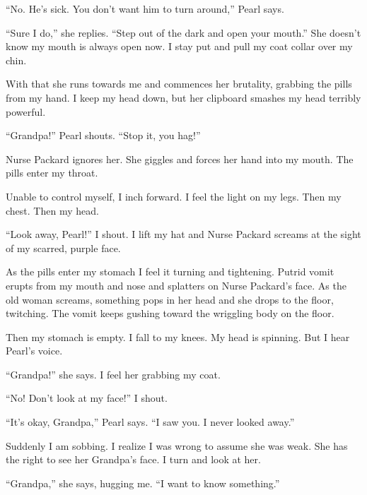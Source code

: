 ``No. He's sick. You don't want him to turn
around,'' Pearl says.



``Sure I do,'' she replies. ``Step out of the dark
and open your mouth.'' She doesn't know my mouth is
always open now. I stay put and pull my coat collar over my
chin.



With that she runs towards me and commences her brutality, grabbing
the pills from my hand. I keep my head down, but her clipboard
smashes my head terribly powerful.



``Grandpa!'' Pearl shouts. ``Stop it, you
hag!''



Nurse Packard ignores her. She giggles and forces her hand into my
mouth. The pills enter my throat.



Unable to control myself, I inch forward. I feel the light on my
legs. Then my chest. Then my head.



``Look away, Pearl!'' I shout. I lift my hat and Nurse
Packard screams at the sight of my scarred, purple face.



As the pills enter my stomach I feel it turning and tightening.
Putrid vomit erupts from my mouth and nose and splatters on Nurse
Packard's face. As the old woman screams, something pops in
her head and she drops to the floor, twitching. The vomit keeps
gushing toward the wriggling body on the floor.



Then my stomach is empty. I fall to my knees. My head is spinning.
But I hear Pearl's voice.



``Grandpa!'' she says. I feel her grabbing my coat.



``No! Don't look at my face!'' I shout.



``It's okay, Grandpa,'' Pearl says. ``I saw
you. I never looked away.''



Suddenly I am sobbing. I realize I was wrong to assume she was
weak. She has the right to see her Grandpa's face. I turn and
look at her.



``Grandpa,'' she says, hugging me. ``I want to know
something.''



